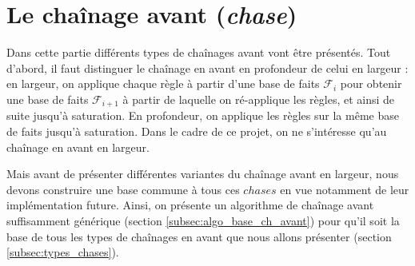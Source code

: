 \section{Le chaînage avant (\textit{chase})}\label{sec:types_de_chases}


Dans cette partie différents types de chaînages avant vont être présentés. Tout d'abord, il faut distinguer le chaînage en avant en profondeur de celui en largeur : en largeur, on applique chaque règle à partir d'une base de faits $\mathcal{F}_i$ pour obtenir une base de faits $\mathcal{F}_{i+1}$ à partir de laquelle on ré-applique les règles, et ainsi de suite jusqu'à saturation. En profondeur, on applique les règles sur la même base de faits jusqu'à saturation. Dans le cadre de ce projet, on ne s'intéresse qu'au chaînage en avant en largeur.
\par Mais avant de présenter différentes variantes du chaînage avant en largeur, nous devons construire une base commune à tous ces $chases$ en vue notamment de leur implémentation future. Ainsi, on présente un algorithme de chaînage avant suffisamment générique (section \ref{subsec:algo_base_ch_avant}) pour qu'il soit la base de tous les types de chaînages en avant que nous allons présenter  (section \ref{subsec:types_chases}).





